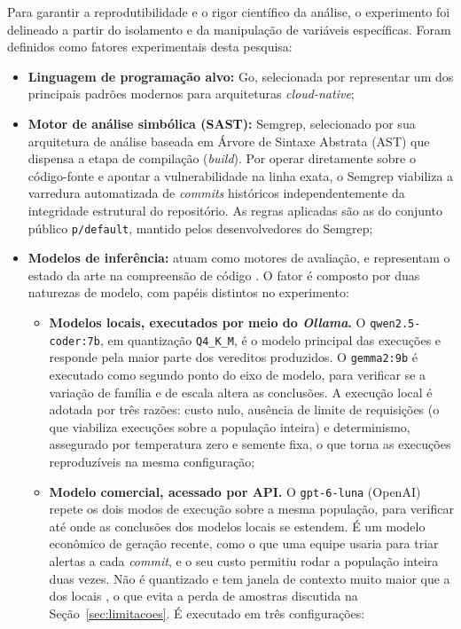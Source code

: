 Para garantir a reprodutibilidade e o rigor científico da análise, o experimento foi delineado a partir do isolamento e da manipulação de variáveis específicas. Foram definidos como fatores experimentais desta pesquisa:

\begin{itemize}
    \item \textbf{Linguagem de programação alvo:} Go, selecionada por representar um dos principais padrões modernos para arquiteturas \textit{cloud-native};
    \item \textbf{Motor de análise simbólica (SAST):} Semgrep, selecionado por sua arquitetura de análise baseada em Árvore de Sintaxe Abstrata (AST) que dispensa a etapa de compilação (\textit{build}). Por operar diretamente sobre o código-fonte e apontar a vulnerabilidade na linha exata, o Semgrep viabiliza a varredura automatizada de \textit{commits} históricos independentemente da integridade estrutural do repositório. As regras aplicadas são as do conjunto público \texttt{p/default}, mantido pelos desenvolvedores do Semgrep;
   \item \textbf{Modelos de inferência:} atuam como motores de avaliação, e representam o estado da arte na compreensão de código \cite{hou2024large}. O fator é composto por duas naturezas de modelo, com papéis distintos no experimento:
   \begin{itemize}
       \item \textbf{Modelos locais, executados por meio do \textit{Ollama}.} O \texttt{qwen2.5-coder:7b}, em quantização \texttt{Q4\_K\_M}, é o modelo principal das execuções e responde pela maior parte dos vereditos produzidos. O \texttt{gemma2:9b} é executado como segundo ponto do eixo de modelo, para verificar se a variação de família e de escala altera as conclusões. A execução local é adotada por três razões: custo nulo, ausência de limite de requisições (o que viabiliza execuções sobre a população inteira) e determinismo, assegurado por temperatura zero e semente fixa, o que torna as execuções reproduzíveis na mesma configuração;
       \item \textbf{Modelo comercial, acessado por API.} O \texttt{gpt-6-luna} (OpenAI) repete os dois modos de execução sobre a mesma população, para verificar até onde as conclusões dos modelos locais se estendem. É um modelo econômico de geração recente, como o que uma equipe usaria para triar alertas a cada \textit{commit}, e o seu custo permitiu rodar a população inteira duas vezes. Não é quantizado e tem janela de contexto muito maior que a dos locais \cite{openaidocs2026}, o que evita a perda de amostras discutida na Seção~\ref{sec:limitacoes}. É executado em três configurações:

\end{itemize}
\end{itemize}
